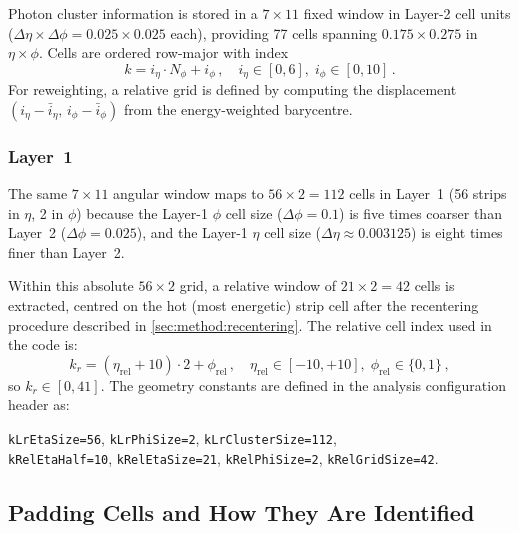 \documentclass[11pt,a4paper]{article}
\begin{document}
Photon cluster information is stored in a $7 \times 11$ fixed window
in Layer-2 cell units ($\Delta\eta \times \Delta\phi = 0.025 \times
0.025$ each), providing 77 cells spanning
$0.175 \times 0.275$ in $\eta \times \phi$.  Cells are ordered
row-major with index
\begin{equation}
  k = i_\eta \cdot N_\phi + i_\phi\,,
  \quad
  i_\eta \in [0, 6],\;i_\phi \in [0, 10]\,.
  \label{eq:cellindex:l2}
\end{equation}
For reweighting, a relative grid is defined by computing the
displacement $(i_\eta - \bar{i}_\eta,\, i_\phi - \bar{i}_\phi)$
from the energy-weighted barycentre.

\subsubsection{Layer~1}
\label{sec:method:grid:l1}

The same $7 \times 11$ angular window maps to $56 \times 2 = 112$
cells in Layer~1 (56 strips in $\eta$, 2 in $\phi$) because the
Layer-1 $\phi$ cell size ($\Delta\phi = 0.1$) is five times coarser
than Layer~2 ($\Delta\phi = 0.025$), and the Layer-1 $\eta$ cell
size ($\Delta\eta \approx 0.003125$) is eight times finer than
Layer~2.

Within this absolute $56 \times 2$ grid, a relative window of
$21 \times 2 = 42$ cells is extracted, centred on the hot
(most energetic) strip cell after the recentering procedure
described in \cref{sec:method:recentering}.  The relative cell index
used in the code is:
\begin{equation}
  k_r = (\eta_\mathrm{rel} + 10) \cdot 2 + \phi_\mathrm{rel}\,,
  \quad
  \eta_\mathrm{rel} \in [-10, +10],\;
  \phi_\mathrm{rel} \in \{0, 1\}\,,
  \label{eq:cellindex:l1}
\end{equation}
so $k_r \in [0, 41]$.  The geometry constants are defined in the
analysis configuration header as:
\begin{center}
\texttt{kLrEtaSize=56},\quad
\texttt{kLrPhiSize=2},\quad
\texttt{kLrClusterSize=112},\\[4pt]
\texttt{kRelEtaHalf=10},\quad
\texttt{kRelEtaSize=21},\quad
\texttt{kRelPhiSize=2},\quad
\texttt{kRelGridSize=42}.
\end{center}

\subsection{Padding Cells and How They Are Identified}
\label{sec:method:padding}
\end{document}

